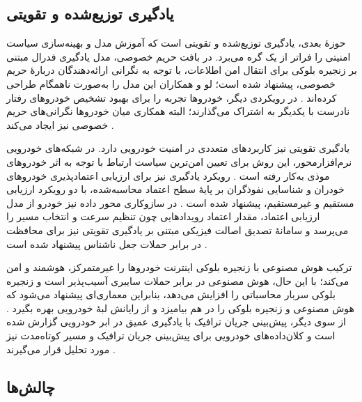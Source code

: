 \documentclass[12pt,a4paper]{article}
\begin{document}
\subsection{یادگیری توزیع‌شده و تقویتی}

حوزهٔ بعدی، یادگیری توزیع‌شده و تقویتی است که آموزش مدل و بهینه‌سازی سیاست امنیتی را فراتر از یک گره می‌برد. در بافت حریم خصوصی، مدل یادگیری فدرال  مبتنی بر زنجیره بلوکی برای انتقال امن اطلاعات، با توجه به نگرانی ارائه‌دهندگان دربارهٔ حریم خصوصی، پیشنهاد شده است؛ لو و همکاران این مدل را به‌صورت ناهمگام طراحی کرده‌اند \cite{farsimadanReviewSecurityChallenges2025}. در رویکردی دیگر، خودرو‌ها تجربه را برای بهبود تشخیص خودرو‌های رفتار نادرست با یکدیگر به اشتراک می‌گذارند؛ البته همکاری میان خودرو‌ها نگرانی‌های حریم خصوصی نیز ایجاد می‌کند \cite{farsimadanReviewSecurityChallenges2025}.

یادگیری تقویتی  نیز کاربرد‌های متعددی در امنیت خودرویی دارد. در شبکه‌های خودرویی نرم‌افزارمحور، این روش برای تعیین امن‌ترین سیاست ارتباط با توجه به اثر خودرو‌های موذی به‌کار رفته است \cite{farsimadanReviewSecurityChallenges2025}. رویکرد یادگیری  نیز برای ارزیابی اعتمادپذیری خودرو‌های خودران و شناسایی نفوذگران بر پایهٔ سطح اعتماد محاسبه‌شده، با دو رویکرد ارزیابی مستقیم و غیرمستقیم، پیشنهاد شده است \cite{farsimadanReviewSecurityChallenges2025}. در سازوکاری محور داده نیز خودرو از مدل ارزیابی اعتماد، مقدار اعتماد رویداد‌هایی چون تنظیم سرعت و انتخاب مسیر را می‌پرسد \cite{farsimadanReviewSecurityChallenges2025} و سامانهٔ تصدیق اصالت فیزیکی مبتنی بر یادگیری تقویتی نیز برای محافظت در برابر حملات جعل ناشناس پیشنهاد شده است \cite{farsimadanReviewSecurityChallenges2025}.

ترکیب هوش مصنوعی با زنجیره بلوکی اینترنت خودرو‌ها را غیرمتمرکز، هوشمند و امن می‌کند؛ با این حال، هوش مصنوعی در برابر حملات سایبری آسیب‌پذیر است و زنجیره بلوکی سربار محاسباتی را افزایش می‌دهد، بنابراین معماری‌ای پیشنهاد می‌شود که هوش مصنوعی و زنجیره بلوکی را در هم بیامیزد و از رایانش لبهٔ خودرویی بهره بگیرد \cite{hozouriOverviewVANETVehicular2023}. از سوی دیگر، پیش‌بینی جریان ترافیک با یادگیری عمیق در ابر خودرویی گزارش شده است \cite{farsimadanReviewSecurityChallenges2025} و کلان‌داده‌های خودرویی برای پیش‌بینی جریان ترافیک و مسیر کوتاه‌مدت نیز مورد تحلیل قرار می‌گیرند \cite{xuInternetVehiclesBig2018}.

\subsection{چالش‌ها}
\end{document}
